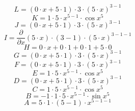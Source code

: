 \documentclass[12pt]{article}
\begin{document}
\begin{equation}
	L = 
\left( 0\cdot x + 5\cdot 1\right) \cdot 3\cdot \left( 5\cdot x\right) ^{3 - 1}
\end{equation}
\begin{equation}
	K = 
1\cdot 5\cdot x^{5 - 1}\cdot \cos {x^{5}}
\end{equation}
\begin{equation}
	J = 
\left( 0\cdot x + 5\cdot 1\right) \cdot 3\cdot \left( 5\cdot x\right) ^{3 - 1}
\end{equation}
\begin{equation}
	I = 
\frac{\partial}{\partial x}\left( 5\cdot x\right) \cdot \left( 3 - 1\right) \cdot \left( 5\cdot x\right) ^{3 - 1 - 1}
\end{equation}
\begin{equation}
	H = 
0\cdot x + 0\cdot 1 + 0\cdot 1 + 5\cdot 0
\end{equation}
\begin{equation}
	G = 
\left( 0\cdot x + 5\cdot 1\right) \cdot 3\cdot \left( 5\cdot x\right) ^{3 - 1}
\end{equation}
\begin{equation}
	F = 
\left( 0\cdot x + 5\cdot 1\right) \cdot 3\cdot \left( 5\cdot x\right) ^{3 - 1}
\end{equation}
\begin{equation}
	E = 
1\cdot 5\cdot x^{5 - 1}\cdot \cos {x^{5}}
\end{equation}
\begin{equation}
	D = 
\left( 0\cdot x + 5\cdot 1\right) \cdot 3\cdot \left( 5\cdot x\right) ^{3 - 1}
\end{equation}
\begin{equation}
	C = 
1\cdot 5\cdot x^{5 - 1}\cdot \cos {x^{5}}
\end{equation}
\begin{equation}
	B = 
-1\cdot 1\cdot 5\cdot x^{5 - 1}\cdot \sin {x^{5}}
\end{equation}
\begin{equation}
	A = 
5\cdot 1\cdot \left( 5 - 1\right) \cdot x^{5 - 1 - 1}
\end{equation}
\end{document}
